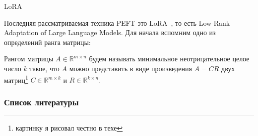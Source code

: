 \documentclass[9pt]{beamer}
\begin{document}
\begin{frame}{LoRA}
    
    Последняя рассматриваемая техника PEFT это LoRA~\cite{lora}, то есть Low-Rank Adaptation of Large Language Models. Для начала вспомним одно из определений ранга матрицы:

    \begin{definition}
        Рангом матрицы $A \in \mathbb{R}^{m \times n}$ будем называть минимальное неотрицательное целое число $k$ такое, что $A$ можно представить в виде произведения $A = C R$ двух матриц\footnote{картинку я рисовал честно в техе} $C \in \mathbb{R}^{m \times k}$ и $R \in \mathbb{R}^{k \times n}$.

        \begin{figure}
            \begin{center}
            \end{center}
        \end{figure}

    \end{definition}

\end{frame}


\begin{frame}[allowframebreaks]
    \frametitle{Список литературы}
    \printbibliography
\end{frame}
\end{document}
